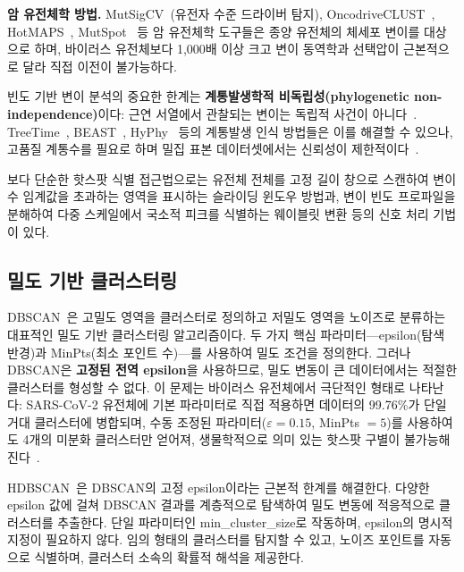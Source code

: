 \textbf{암 유전체학 방법.}
MutSigCV~\cite{lawrence2013mutsigcv}(유전자 수준 드라이버 탐지), OncodriveCLUST~\cite{tamborero2013oncodriveclust}, HotMAPS~\cite{tokheim2016hotmaps}, MutSpot~\cite{munoz2020mutspot} 등 암 유전체학 도구들은 종양 유전체의 체세포 변이를 대상으로 하며, 바이러스 유전체보다 1,000배 이상 크고 변이 동역학과 선택압이 근본적으로 달라 직접 이전이 불가능하다.

빈도 기반 변이 분석의 중요한 한계는 \textbf{계통발생학적 비독립성(phylogenetic non-independence)}이다: 근연 서열에서 관찰되는 변이는 독립적 사건이 아니다~\cite{felsenstein1985phylogenies}.
TreeTime~\cite{sagulenko2018treetime}, BEAST~\cite{suchard2018beast}, HyPhy~\cite{kosakovsky2020hyphy} 등의 계통발생 인식 방법들은 이를 해결할 수 있으나, 고품질 계통수를 필요로 하며 밀집 표본 데이터셋에서는 신뢰성이 제한적이다~\cite{turakhia2020ultrafast}.

보다 단순한 핫스팟 식별 접근법으로는 유전체 전체를 고정 길이 창으로 스캔하여 변이 수 임계값을 초과하는 영역을 표시하는 슬라이딩 윈도우 방법과, 변이 빈도 프로파일을 분해하여 다중 스케일에서 국소적 피크를 식별하는 웨이블릿 변환 등의 신호 처리 기법이 있다.

\subsection{밀도 기반 클러스터링}
\label{subsec:bg_density_clustering}

DBSCAN~\cite{ester1996dbscan}은 고밀도 영역을 클러스터로 정의하고 저밀도 영역을 노이즈로 분류하는 대표적인 밀도 기반 클러스터링 알고리즘이다.
두 가지 핵심 파라미터---epsilon(탐색 반경)과 MinPts(최소 포인트 수)---를 사용하여 밀도 조건을 정의한다.
그러나 DBSCAN은 \textbf{고정된 전역 epsilon}을 사용하므로, 밀도 변동이 큰 데이터에서는 적절한 클러스터를 형성할 수 없다.
이 문제는 바이러스 유전체에서 극단적인 형태로 나타난다:
SARS-CoV-2 유전체에 기본 파라미터로 직접 적용하면 데이터의 99.76\%가 단일 거대 클러스터에 병합되며, 수동 조정된 파라미터($\varepsilon = 0.15$, MinPts $= 5$)를 사용하여도 4개의 미분화 클러스터만 얻어져, 생물학적으로 의미 있는 핫스팟 구별이 불가능해진다~\cite{youn2025mutclust}.

HDBSCAN~\cite{campello2013hdbscan}은 DBSCAN의 고정 epsilon이라는 근본적 한계를 해결한다.
다양한 epsilon 값에 걸쳐 DBSCAN 결과를 계층적으로 탐색하여 밀도 변동에 적응적으로 클러스터를 추출한다.
단일 파라미터인 min\_cluster\_size로 작동하며, epsilon의 명시적 지정이 필요하지 않다.
임의 형태의 클러스터를 탐지할 수 있고, 노이즈 포인트를 자동으로 식별하며, 클러스터 소속의 확률적 해석을 제공한다.

